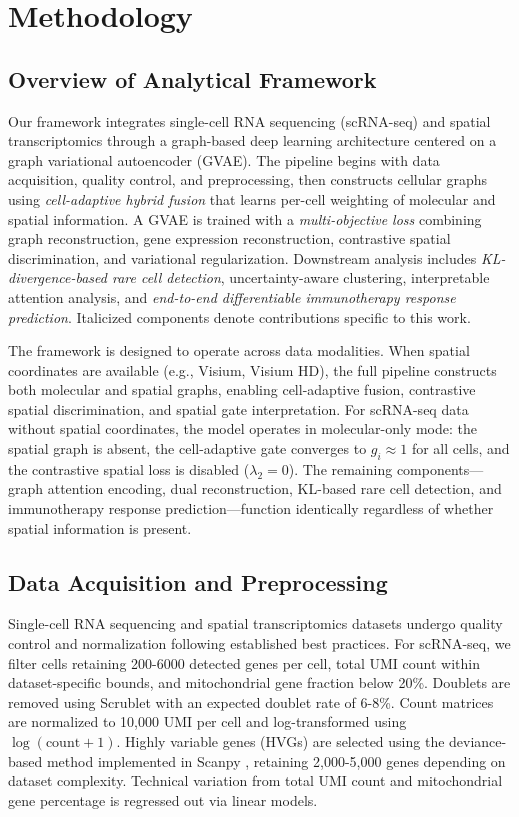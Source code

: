 \documentclass{article}
\begin{document}
\section{Methodology}

\subsection{Overview of Analytical Framework}

Our framework integrates single-cell RNA sequencing (scRNA-seq) and spatial transcriptomics through a graph-based deep learning architecture centered on a graph variational autoencoder (GVAE). The pipeline begins with data acquisition, quality control, and preprocessing, then constructs cellular graphs using \textit{cell-adaptive hybrid fusion} that learns per-cell weighting of molecular and spatial information. A GVAE is trained with a \textit{multi-objective loss} combining graph reconstruction, gene expression reconstruction, contrastive spatial discrimination, and variational regularization. Downstream analysis includes \textit{KL-divergence-based rare cell detection}, uncertainty-aware clustering, interpretable attention analysis, and \textit{end-to-end differentiable immunotherapy response prediction}. Italicized components denote contributions specific to this work.

The framework is designed to operate across data modalities. When spatial coordinates are available (e.g., Visium, Visium HD), the full pipeline constructs both molecular and spatial graphs, enabling cell-adaptive fusion, contrastive spatial discrimination, and spatial gate interpretation. For scRNA-seq data without spatial coordinates, the model operates in molecular-only mode: the spatial graph is absent, the cell-adaptive gate converges to $g_i \approx 1$ for all cells, and the contrastive spatial loss is disabled ($\lambda_2 = 0$). The remaining components---graph attention encoding, dual reconstruction, KL-based rare cell detection, and immunotherapy response prediction---function identically regardless of whether spatial information is present.

\subsection{Data Acquisition and Preprocessing}

Single-cell RNA sequencing and spatial transcriptomics datasets undergo quality control and normalization following established best practices. For scRNA-seq, we filter cells retaining 200-6000 detected genes per cell, total UMI count within dataset-specific bounds, and mitochondrial gene fraction below 20\%. Doublets are removed using Scrublet \cite{wolock2019scrublet} with an expected doublet rate of 6-8\%. Count matrices are normalized to 10{,}000 UMI per cell and log-transformed using $\log(\text{count} + 1)$. Highly variable genes (HVGs) are selected using the deviance-based method implemented in Scanpy \cite{wolf2018scanpy}, retaining 2{,}000-5{,}000 genes depending on dataset complexity. Technical variation from total UMI count and mitochondrial gene percentage is regressed out via linear models.
\end{document}
